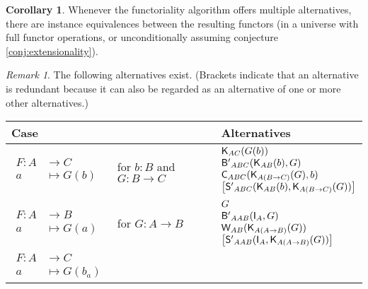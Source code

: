 \documentclass[a4paper]{article}
\theoremstyle{definition}
\newtheorem{corollary}[definition]{Corollary}
\theoremstyle{remark}
\newtheorem*{remark}{Remark}
\newcommand{\nm}{\mathsf}
\newcommand{\combinator}{\nm}
\newcommand{\idFun}{\combinator{I}}
\newcommand{\constFun}{\combinator{K}}
\newcommand{\compFun}{\combinator{B'}}
\newcommand{\swapFun}{\combinator{C}}
\newcommand{\dupFun}{\combinator{W}}
\newcommand{\substFun}{\combinator{S'}}
\begin{document}
\begin{corollary}
  Whenever the functoriality algorithm offers multiple alternatives, there are instance
  equivalences between the resulting functors (in a universe with full functor
  operations, or unconditionally assuming conjecture \ref{conj:extensionality}).
\end{corollary}

\begin{remark}
  The following alternatives exist. (Brackets indicate that an alternative is redundant
  because it can also be regarded as an alternative of one or more other alternatives.)

  \begin{longtable}{ll|l}
    Case & & Alternatives\\
    \hline\hline
    \rule{0pt}{3em}
    $\begin{aligned}
      F : A &\to     C\\
          a &\mapsto G(b)
    \end{aligned}$ &
    \parbox{3cm}{for $b : B$ \\ and $G : B \to C$} &
    $\begin{array}{@{}l@{}}
      \constFun_{AC}(G(b))\\
      \compFun_{ABC}(\constFun_{AB}(b),G)\\
      \swapFun_{ABC}(\constFun_{A(B{\to}C)}(G),b)\\
      \left[\substFun_{ABC}(\constFun_{AB}(b),\constFun_{A(B{\to}C)}(G))\right]
    \end{array}$\\
    \hline
    \rule{0pt}{3em}
    $\begin{aligned}
      F : A &\to     B\\
          a &\mapsto G(a)
    \end{aligned}$ &
    for $G : A \to B$ &
    $\begin{array}{@{}l@{}}
      G\\
      \compFun_{AAB}(\idFun_A,G)\\
      \dupFun_{AB}(\constFun_{A(A{\to}B)}(G))\\
      \left[\substFun_{AAB}(\idFun_A,\constFun_{A(A{\to}B)}(G))\right]
    \end{array}$\\
    \hline
    \rule{0pt}{2em}
    $\begin{aligned}
      F : A &\to     C\\
          a &\mapsto G(b_a)
    \end{aligned}$ &

\end{longtable}
\end{remark}
\end{document}
